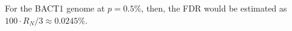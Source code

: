 For the BACT1 genome at $p = 0.5\%$, then,
the FDR would be estimated as $100 \cdot R_N / 3 \approx 0.0245\%$.
\endinput